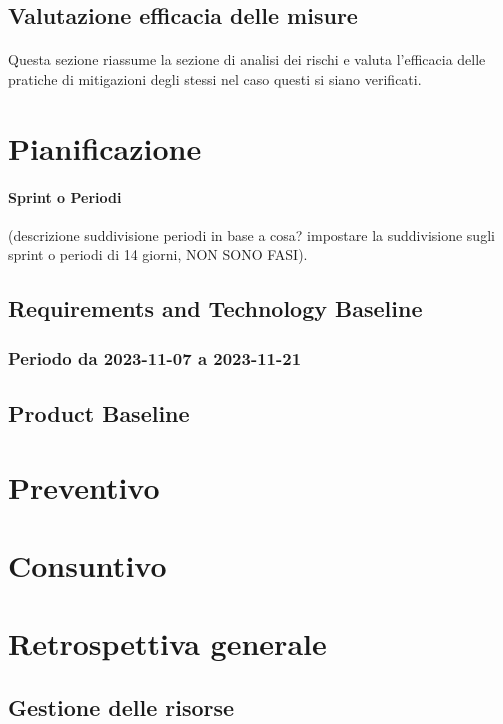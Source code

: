 \documentclass[10pt, a4paper]{article}
\begin{document}
{{{{{{{\subsection{Valutazione efficacia delle misure}
\paragraph{}Questa sezione riassume la sezione di analisi dei rischi e valuta l'efficacia delle pratiche di mitigazioni degli stessi nel caso questi si siano verificati.


\section{Pianificazione}

\color{gray}\paragraph{Sprint o Periodi}
(descrizione suddivisione periodi in base a cosa? impostare la suddivisione sugli sprint o periodi di 14 giorni, NON SONO FASI).
\color{black}
\subsection{Requirements and Technology Baseline}
\subsubsection{Periodo da 2023-11-07 a 2023-11-21}

\subsection{Product Baseline}


\section{Preventivo}




\section{Consuntivo}

\section{Retrospettiva generale}
\subsection{Gestione delle risorse}
}}}}}}}
\end{document}
